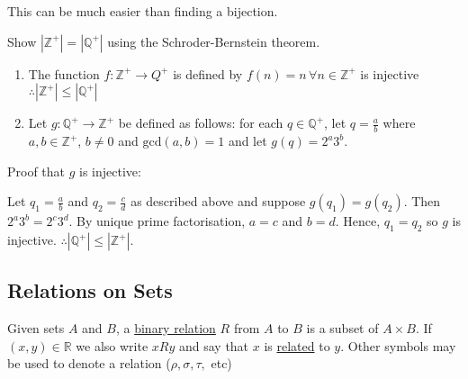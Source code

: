 This can be much easier than finding a bijection.

\begin{example}
    Show $|\mathbb Z^+| = |\mathbb Q^+|$ using the Schroder-Bernstein theorem.

    \begin{enumerate}
        \item The function $f:\mathbb Z^+ \rightarrow Q^+$ is defined by $f(n) = n\,\forall n\in\mathbb Z^+$ is injective $\therefore |\mathbb Z^+| \leq |\mathbb Q^+|$
        \item Let $g:\mathbb Q^+ \rightarrow \mathbb Z^+$ be defined as follows: for each $q\in\mathbb Q^+$, let $q = \frac{a}{b}$ where $a,b\in\mathbb Z^+$, $b\neq 0$ and $\text{gcd}(a,b)= 1$ and let $g(q) = 2^a 3^b$.
    \end{enumerate}

    Proof that $g$ is injective:

    Let $q_1 = \frac{a}{b}$ and $q_2 = \frac{c}{d}$ as described above and suppose $g(q_1) = g(q_2)$. Then $2^a 3^b = 2^c 3^d$. By unique prime factorisation, $a=c$ and $b=d$. Hence, $q_1=q_2$ so $g$ is injective. $\therefore |\mathbb Q^+| \leq |\mathbb Z^+|$.
\end{example}

\subsection{Relations on Sets}
\begin{definition}
    Given sets $A$ and $B$, a \underline{binary relation} $R$ from $A$ to $B$ is a subset of $A\times B$. If $(x,y)\in\mathbb R$ we also write $xRy$ and say that $x$ is \underline{related} to $y$. Other symbols may be used to denote a relation ($\rho, \sigma, \tau,$ etc)
\end{definition}

